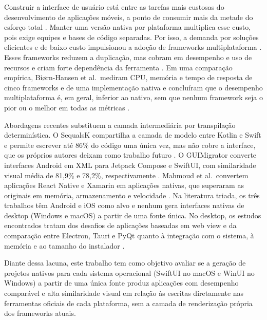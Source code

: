 
Construir a interface de usuário está entre as tarefas mais custosas do desenvolvimento de aplicações móveis, a ponto de consumir mais da metade do esforço total \cite{gao2026guimigrator}. Manter uma versão nativa por plataforma multiplica esse custo, pois exige equipes e bases de código separadas. Por isso, a demanda por soluções eficientes e de baixo custo impulsionou a adoção de frameworks multiplataforma \cite{jost2025state}. Esses frameworks reduzem a duplicação, mas cobram em desempenho e uso de recursos e criam forte dependência da ferramenta \cite{biorn2020empirical, mahmoud2024trans, schultes2025native}. Em uma comparação empírica, Biørn-Hansen et al.\ mediram CPU, memória e tempo de resposta de cinco frameworks e de uma implementação nativa e concluíram que o desempenho multiplataforma é, em geral, inferior ao nativo, sem que nenhum framework seja o pior ou o melhor em todas as métricas \cite{biorn2020empirical}.

Abordagens recentes substituem a camada intermediária por transpilação determinística. O SequalsK compartilha a camada de modelo entre Kotlin e Swift e permite escrever até 86\% do código uma única vez, mas não cobre a interface, que os próprios autores deixam como trabalho futuro \cite{schultes2025native}. O GUIMigrator converte interfaces Android em XML para Jetpack Compose e SwiftUI, com similaridade visual média de 81,9\% e 78,2\%, respectivamente \cite{gao2026guimigrator}. Mahmoud et al.\ convertem aplicações React Native e Xamarin em aplicações nativas, que superaram as originais em memória, armazenamento e velocidade \cite{mahmoud2024trans}. Na literatura triada, os três trabalhos têm Android e iOS como alvo e nenhum gera interfaces nativas de desktop (Windows e macOS) a partir de uma fonte única. No desktop, os estudos encontrados tratam dos desafios de aplicações baseadas em web view \cite{scoccia2021challenges} e da comparação entre Electron, Tauri e PyQt quanto à integração com o sistema, à memória e ao tamanho do instalador \cite{milichiewicz2025comparative}.

Diante dessa lacuna, este trabalho tem como objetivo avaliar se a geração de projetos nativos para cada sistema operacional (SwiftUI no macOS e WinUI no Windows) a partir de uma única fonte produz aplicações com desempenho comparável e alta similaridade visual em relação às escritas diretamente nas ferramentas oficiais de cada plataforma, sem a camada de renderização própria dos frameworks atuais.
